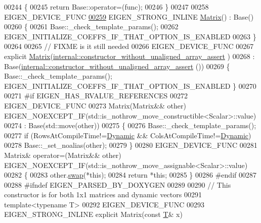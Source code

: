 \begin{DoxyCode}
00244     \{
00245       \textcolor{keywordflow}{return} Base::operator=(func);
00246     \}
00247 
00258     EIGEN\_DEVICE\_FUNC
\hyperlink{group___core___module_a11f852d66fa55b2aed12aa22da807a6b}{00259}     EIGEN\_STRONG\_INLINE \hyperlink{group___core___module_a11f852d66fa55b2aed12aa22da807a6b}{Matrix}() : Base()
00260     \{
00261       Base::\_check\_template\_params();
00262       EIGEN\_INITIALIZE\_COEFFS\_IF\_THAT\_OPTION\_IS\_ENABLED
00263     \}
00264 
00265     \textcolor{comment}{// FIXME is it still needed}
00266     EIGEN\_DEVICE\_FUNC
00267     \textcolor{keyword}{explicit} \hyperlink{group___core___module_class_eigen_1_1_matrix}{Matrix}(\hyperlink{struct_eigen_1_1internal_1_1constructor__without__unaligned__array__assert}{internal::constructor\_without\_unaligned\_array\_assert}
      )
00268       : Base(\hyperlink{struct_eigen_1_1internal_1_1constructor__without__unaligned__array__assert}{internal::constructor\_without\_unaligned\_array\_assert}
      ())
00269     \{ Base::\_check\_template\_params(); EIGEN\_INITIALIZE\_COEFFS\_IF\_THAT\_OPTION\_IS\_ENABLED \}
00270 
00271 \textcolor{preprocessor}{#if EIGEN\_HAS\_RVALUE\_REFERENCES}
00272     EIGEN\_DEVICE\_FUNC
00273     Matrix(Matrix&& other) EIGEN\_NOEXCEPT\_IF(std::is\_nothrow\_move\_constructible<Scalar>::value)
00274       : Base(std::move(other))
00275     \{
00276       Base::\_check\_template\_params();
00277       \textcolor{keywordflow}{if} (RowsAtCompileTime!=\hyperlink{namespace_eigen_ad81fa7195215a0ce30017dfac309f0b2}{Dynamic} && ColsAtCompileTime!=\hyperlink{namespace_eigen_ad81fa7195215a0ce30017dfac309f0b2}{Dynamic})
00278         Base::\_set\_noalias(other);
00279     \}
00280     EIGEN\_DEVICE\_FUNC
00281     Matrix& operator=(Matrix&& other) EIGEN\_NOEXCEPT\_IF(std::is\_nothrow\_move\_assignable<Scalar>::value)
00282     \{
00283       other.\hyperlink{group___core___module_ab420d9d588ac443f5a1b1a7dceb12c90}{swap}(*\textcolor{keyword}{this});
00284       \textcolor{keywordflow}{return} *\textcolor{keyword}{this};
00285     \}
00286 \textcolor{preprocessor}{#endif}
00287 
00288 \textcolor{preprocessor}{    #ifndef EIGEN\_PARSED\_BY\_DOXYGEN}
00289 
00290     \textcolor{comment}{// This constructor is for both 1x1 matrices and dynamic vectors}
00291     \textcolor{keyword}{template}<\textcolor{keyword}{typename} T>
00292     EIGEN\_DEVICE\_FUNC
00293     EIGEN\_STRONG\_INLINE \textcolor{keyword}{explicit} Matrix(\textcolor{keyword}{const} \hyperlink{group___sparse_core___module}{T}& x)

\end{DoxyCode}

